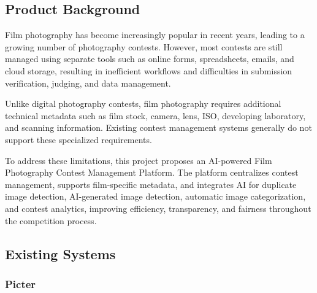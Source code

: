 \subsection{Product Background}
\label{subsec:product_background}
\begingroup
\setlength{\parindent}{1.5em}
\setlength{\parskip}{0.8em}

Film photography has become increasingly popular in recent years, leading to a growing number of photography contests. However, most contests are still managed using separate tools such as online forms, spreadsheets, emails, and cloud storage, resulting in inefficient workflows and difficulties in submission verification, judging, and data management.

Unlike digital photography contests, film photography requires additional technical metadata such as film stock, camera, lens, ISO, developing laboratory, and scanning information. Existing contest management systems generally do not support these specialized requirements.

To address these limitations, this project proposes an AI-powered Film Photography Contest Management Platform. The platform centralizes contest management, supports film-specific metadata, and integrates AI for duplicate image detection, AI-generated image detection, automatic image categorization, and contest analytics, improving efficiency, transparency, and fairness throughout the competition process.
\endgroup

\subsection{Existing Systems}
\label{subsec:existing_systems}

\subsubsection{Picter}
\label{subsubsec:picter}

